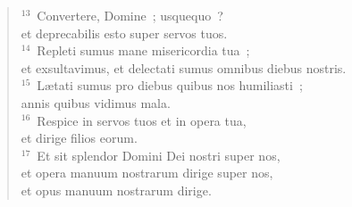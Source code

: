 \begin{flushleft}
\begin{verse}
${}^{13}$~Convertere, Domine~; usquequo~?\\ et deprecabilis esto super servos tuos.\\
${}^{14}$~Repleti sumus mane misericordia tua~;\\ et exsultavimus, et delectati sumus omnibus diebus nostris.\\
${}^{15}$~L\ae tati sumus pro diebus quibus nos humiliasti~;\\ annis quibus vidimus mala.\\
${}^{16}$~Respice in servos tuos et in opera tua,\\ et dirige filios eorum.\\
${}^{17}$~Et sit splendor Domini Dei nostri super nos,\\ et opera manuum nostrarum dirige super nos,\\ et opus manuum nostrarum dirige.\end{verse}\end{flushleft}



